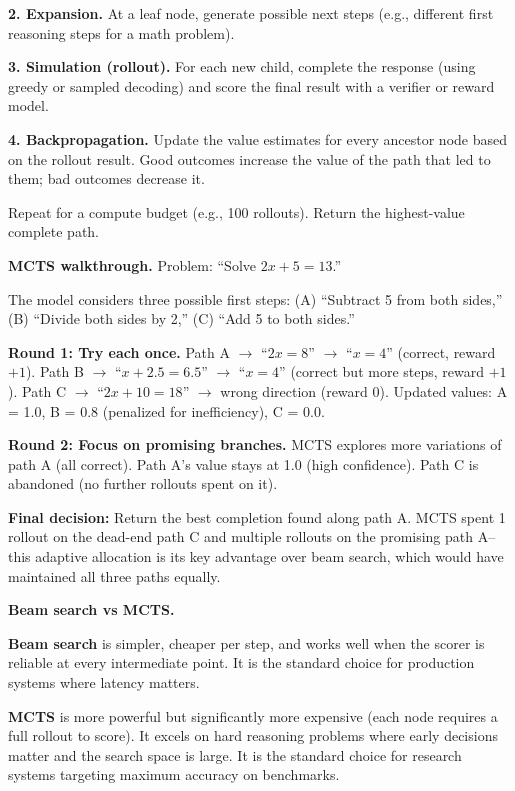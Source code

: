 \begin{chapterenv}
\begin{infobox}
\textbf{2. Expansion.} At a leaf node, generate possible next steps (e.g., different first reasoning steps for a math problem).

\textbf{3. Simulation (rollout).} For each new child, complete the response (using greedy or sampled decoding) and score the final result with a verifier or reward model.

\textbf{4. Backpropagation.} Update the value estimates for every ancestor node based on the rollout result. Good outcomes increase the value of the path that led to them; bad outcomes decrease it.

Repeat for a compute budget (e.g., 100 rollouts). Return the highest-value complete path.
\end{infobox}

\textbf{MCTS walkthrough.} Problem: ``Solve $2x + 5 = 13$.''

The model considers three possible first steps: (A) ``Subtract 5 from both sides,'' (B) ``Divide both sides by 2,'' (C) ``Add 5 to both sides.''

\textbf{Round 1: Try each once.} Path A $\to$ ``$2x = 8$'' $\to$ ``$x = 4$'' (correct, reward $+1$). Path B $\to$ ``$x + 2.5 = 6.5$'' $\to$ ``$x = 4$'' (correct but more steps, reward $+1$). Path C $\to$ ``$2x + 10 = 18$'' $\to$ wrong direction (reward $0$). Updated values: A = 1.0, B = 0.8 (penalized for inefficiency), C = 0.0.

\textbf{Round 2: Focus on promising branches.} MCTS explores more variations of path A (all correct). Path A's value stays at 1.0 (high confidence). Path C is abandoned (no further rollouts spent on it).

\textbf{Final decision:} Return the best completion found along path A. MCTS spent 1 rollout on the dead-end path C and multiple rollouts on the promising path A--this adaptive allocation is its key advantage over beam search, which would have maintained all three paths equally.

\begin{tipbox}
\textbf{Beam search vs MCTS.}

\textbf{Beam search} is simpler, cheaper per step, and works well when the scorer is reliable at every intermediate point. It is the standard choice for production systems where latency matters.

\textbf{MCTS} is more powerful but significantly more expensive (each node requires a full rollout to score). It excels on hard reasoning problems where early decisions matter and the search space is large. It is the standard choice for research systems targeting maximum accuracy on benchmarks.


\end{tipbox}
\end{chapterenv}

